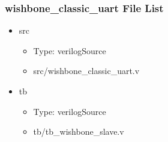 \subsubsection{wishbone\_classic\_uart File List}
\begin{itemize}
\item src
	\begin{itemize}
	\item[$\space$] Type: verilogSource
	\item src/wishbone\_classic\_uart.v
	\end{itemize}
\item tb
	\begin{itemize}
	\item[$\space$] Type: verilogSource
	\item tb/tb\_wishbone\_slave.v
	\end{itemize}
\end{itemize}

